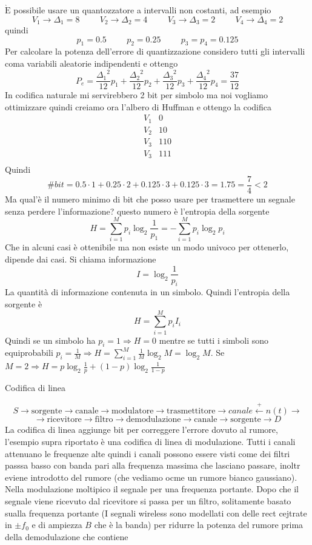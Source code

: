 \documentclass{article}
\newcommand{\Eaccentata}{$\grave{\text{E}}$ }
\begin{document}
\Eaccentata possibile usare un quantozzatore a intervalli non costanti, ad esempio
\[V_1\to\Delta_1=8\hspace{1cm}V_2\to\Delta_2=4\hspace{1cm}V_3\to\Delta_3=2\hspace{1cm}V_4\to\Delta_4=2\]
quindi
\[p_1=0.5\hspace{1cm}p_2=0.25\hspace{1cm}p_3=p_4=0.125\]
Per calcolare la potenza dell'errore di quantizzazione considero tutti gli intervalli coma variabili aleatorie indipendenti e ottengo
\[P_e=\frac{{\Delta_1}^2}{12}p_1+\frac{{\Delta_2}^2}{12}p_2+\frac{{\Delta_3}^2}{12}p_3+\frac{{\Delta_4}^2}{12}p_4=\frac{37}{12}\]
In codifica naturale mi servirebbero 2 bit per simbolo ma noi vogliamo ottimizzare quindi creiamo ora l'albero di Huffman e ottengo la codifica
\[\begin{matrix}
    V_1&0\\
    V_2&10\\
    V_3&110\\
    V_3&111\\
\end{matrix}\]
Quindi
\[\#bit=0.5\cdot 1+0.25\cdot 2+0.125\cdot 3+0.125\cdot 3=1.75=\frac{7}{4}<2\]
Ma qual'è il numero minimo di bit che posso usare per trasmettere un segnale senza perdere l'informazione? questo numero è l'entropia della sorgente
\[H=\sum_{i=1}^M p_i\log_{2}\frac{1}{p_1}=-\sum_{i=1}^M p_i\log_2 p_i\]
Che in alcuni casi è ottenibile ma non esiste un modo univoco per ottenerlo, dipende dai casi. Si chiama informazione
\[I=\log_2\frac{1}{p_i}\]
La quantità di informazione contenuta in un simbolo. Quindi l'entropia della sorgente è
\[H=\sum_{i=1}^M p_i I_i\]
Quindi se un simbolo ha \(p_i=1\Rightarrow H=0\) mentre se tutti i simboli sono equiprobabili \(p_i=\frac{1}{M}\Rightarrow H=\sum_{i=1}^M\frac{1}{M}\log_2 M=\log_2 M\). Se \(M=2\Rightarrow H=p\log_2\frac{1}{p}+(1-p)\log_2\frac{1}{1-p}\)
\newpage
\Huge
\begin{center}Codifica di linea\end{center}
\large
\[S\to\boxed{\text{sorgente}}\to\boxed{\text{canale}}\to{\text{modulatore}}\to\boxed{\text{trasmettitore}}\to\boxed{canale}\xleftarrow{+}n(t)\to\]
\[\to\boxed{\text{ricevitore}}\to\boxed{\text{filtro}}\to\text{demodulazione}\to\boxed{\text{canale}}\to\boxed{\text{sorgente}}\to D\]\normalsize
La codifica di linea aggiunge bit per correggere l'errore dovuto al rumore, l'esempio supra riportato è una codifica di linea di modulazione. Tutti i canali attenuano le frequenze alte quindi i canali possono essere visti come dei filtri passsa basso con banda pari alla frequenza massima che lasciano passare, inoltr eviene introdotto del rumore (che vediamo ocme un rumore bianco gaussiano). Nella modulazione moltipico il segnale per una frequenza portante. Dopo che il segnale viene ricevuto dal ricevitore si passa per un filtro, solitamente basato sualla frequenza portante (I segnali wireless sono modellati con delle rect cejtrate in \(\pm f_0\) e di ampiezza \(B\) che è la banda) per ridurre la potenza del rumore prima della demodulazione che contiene
\end{document}
